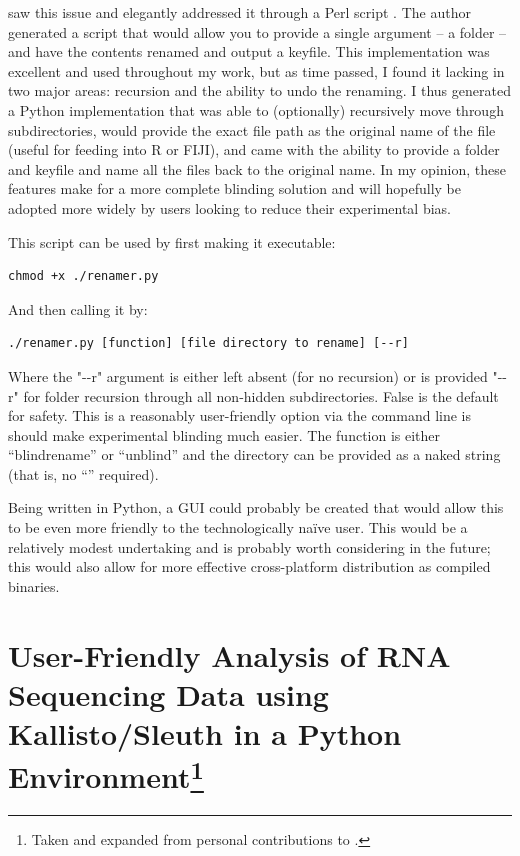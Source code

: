 \citet{Salter2016} saw this issue and elegantly addressed it through a Perl script \citep{Wall2000}. The author generated a script that would allow you to provide a single argument -- a folder -- and have the contents renamed and output a keyfile. This implementation was excellent and used throughout my work, but as time passed, I found it lacking in two major areas: recursion and the ability to undo the renaming. I thus generated a Python implementation that was able to (optionally) recursively move through subdirectories, would provide the exact file path as the original name of the file (useful for feeding into R or FIJI), and came with the ability to provide a folder and keyfile and name all the files back to the original name. In my opinion, these features make for a more complete blinding solution and will hopefully be adopted more widely by users looking to reduce their experimental bias.

This script can be used by first making it executable:

\begin{code}
\begin{verbatim}
chmod +x ./renamer.py
\end{verbatim}
\end{code}

And then calling it by:

\begin{code}
\begin{verbatim}
./renamer.py [function] [file directory to rename] [--r]
\end{verbatim}
\end{code}

Where the "\hyp{}\hyp{}r" argument is either left absent (for no recursion) or is provided "\hyp{}\hyp{}r" for folder recursion through all non\hyp{}hidden subdirectories. False is the default for safety. This is a reasonably user\hyp{}friendly option via the command line is should make experimental blinding much easier. The function is either ``blindrename'' or ``unblind'' and the directory can be provided as a naked string (that is, no ``'' required).

Being written in Python, a GUI could probably be created that would allow this to be even more friendly to the technologically na\"{i}ve user. This would be a relatively modest undertaking and is probably worth considering in the future; this would also allow for more effective cross\hyp{}platform distribution as compiled binaries.

\section[User\hyp{}Friendly Analysis of RNA Sequencing Data using Kallisto/Sleuth in a Python Environment]{User\hyp{}Friendly Analysis of RNA Sequencing Data using Kallisto/Sleuth in a Python Environment\footnote{Taken and expanded from personal contributions to .}}\label{rnaseq}

